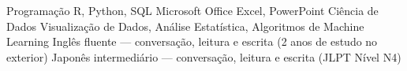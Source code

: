 \begin{cvskills}
  \cvskill
    {Programação}
    {R, Python, SQL}
  \cvskill
    {Microsoft Office}
    {Excel, PowerPoint}
  \cvskill
    {Ciência de Dados}
    {Visualização de Dados, Análise Estatística, Algoritmos de Machine Learning}
    \cvskill
      {Inglês}
      {fluente — conversação, leitura e escrita (2 anos de estudo no exterior)}
    \cvskill
      {Japonês}
      {intermediário — conversação, leitura e escrita (JLPT Nível N4)}
\end{cvskills}
